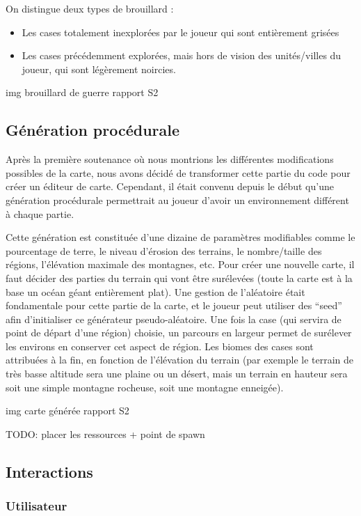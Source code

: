 \documentclass[12pt]{report}
\begin{document}
On distingue deux types de brouillard :

\begin{itemize} \item Les cases totalement inexplorées par le joueur qui sont
entièrement grisées \item Les cases précédemment explorées, mais hors de vision
des unités/villes du joueur, qui sont légèrement noircies.  \end{itemize}

img brouillard de guerre rapport S2

\subsection{Génération procédurale}

Après la première soutenance où nous montrions les différentes modifications
possibles de la carte, nous avons décidé de transformer cette partie du code
pour créer un éditeur de carte. Cependant, il était convenu depuis le début
qu’une génération procédurale permettrait au joueur d’avoir un environnement
différent à chaque partie.

Cette génération est constituée d’une dizaine de paramètres modifiables comme le
pourcentage de terre, le niveau d’érosion des terrains, le nombre/taille des
régions, l’élévation maximale des montagnes, etc. Pour créer une nouvelle carte,
il faut décider des parties du terrain qui vont être surélevées (toute la carte
est à la base un océan géant entièrement plat). Une gestion de l’aléatoire était
fondamentale pour cette partie de la carte, et le joueur peut utiliser des
“seed” afin d’initialiser ce générateur pseudo-aléatoire. Une fois la case (qui
servira de point de départ d’une région) choisie, un parcours en largeur permet
de surélever les environs en conserver cet aspect de région. Les biomes des
cases sont attribuées à la fin, en fonction de l’élévation du terrain (par
exemple le terrain de très basse altitude sera une plaine ou un désert, mais un
terrain en hauteur sera soit une simple montagne rocheuse, soit une montagne
enneigée).

img carte générée rapport S2

TODO: placer les ressources + point de spawn

\subsection{Interactions}

\subsubsection{Utilisateur}
\end{document}
